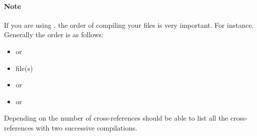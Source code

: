 \paragraph{Note} If you are using \bibtex, the order of compiling your files is very important. For instance. Generally the order is as follows: 
\begin{itemize}
\item {} or 
\item {}  file(s)
\item {} or 
\item {} or 
\end{itemize} 
Depending on the number of cross-references \latex should be able to list all the cross-references with two successive compilations. 


